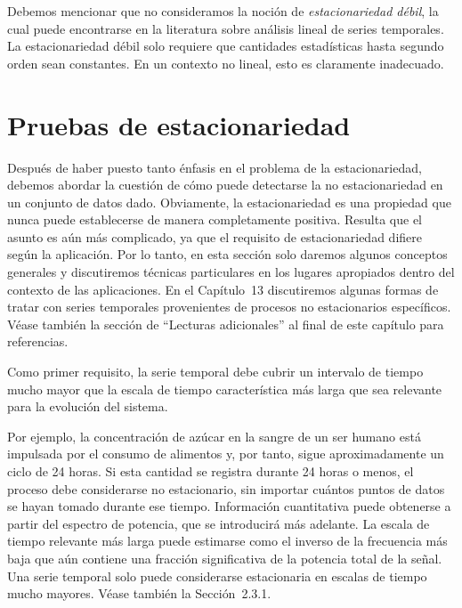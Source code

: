 \documentclass[10pt,a4paper]{book}
\begin{document}
Debemos mencionar que no consideramos la noción de \emph{estacionariedad débil}, la cual puede encontrarse en la literatura sobre análisis lineal de series temporales. La estacionariedad débil solo requiere que cantidades estadísticas hasta segundo orden sean constantes. En un contexto no lineal, esto es claramente inadecuado.

\newpage

\section{Pruebas de estacionariedad}

Después de haber puesto tanto énfasis en el problema de la estacionariedad, debemos abordar la cuestión de cómo puede detectarse la no estacionariedad en un conjunto de datos dado. Obviamente, la estacionariedad es una propiedad que nunca puede establecerse de manera completamente positiva. Resulta que el asunto es aún más complicado, ya que el requisito de estacionariedad difiere según la aplicación. Por lo tanto, en esta sección solo daremos algunos conceptos generales y discutiremos técnicas particulares en los lugares apropiados dentro del contexto de las aplicaciones. En el Capítulo~13 discutiremos algunas formas de tratar con series temporales provenientes de procesos no estacionarios específicos. Véase también la sección de “Lecturas adicionales” al final de este capítulo para referencias.

Como primer requisito, la serie temporal debe cubrir un intervalo de tiempo mucho mayor que la escala de tiempo característica más larga que sea relevante para la evolución del sistema.

\bigskip

Por ejemplo, la concentración de azúcar en la sangre de un ser humano está impulsada por el consumo de alimentos y, por tanto, sigue aproximadamente un ciclo de 24 horas. Si esta cantidad se registra durante 24 horas o menos, el proceso debe considerarse no estacionario, sin importar cuántos puntos de datos se hayan tomado durante ese tiempo. Información cuantitativa puede obtenerse a partir del espectro de potencia, que se introducirá más adelante. La escala de tiempo relevante más larga puede estimarse como el inverso de la frecuencia más baja que aún contiene una fracción significativa de la potencia total de la señal. Una serie temporal solo puede considerarse estacionaria en escalas de tiempo mucho mayores. Véase también la Sección~2.3.1.
\end{document}
